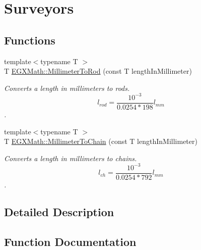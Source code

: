 \hypertarget{group___e_g_x_math-_conversions-_length_conversions-_millimeter-_surveyors}{}\section{Surveyors}
\label{group___e_g_x_math-_conversions-_length_conversions-_millimeter-_surveyors}
\subsection*{Functions}
\begin{DoxyCompactItemize}
\item 
{\footnotesize template$<$typename T $>$ }\\T \mbox{\hyperlink{group___e_g_x_math-_conversions-_length_conversions-_millimeter-_surveyors_ga658a03332f16e17bdd23bd770091b221}{E\+G\+X\+Math\+::\+Millimeter\+To\+Rod}} (const T length\+In\+Millimeter)
\begin{DoxyCompactList}\small\item\em Converts a length in millimeters to rods. \[ l_{rod}= \frac{10^{-3}}{0.0254 * 198} l_{mm} \]. \end{DoxyCompactList}\item 
{\footnotesize template$<$typename T $>$ }\\T \mbox{\hyperlink{group___e_g_x_math-_conversions-_length_conversions-_millimeter-_surveyors_gaacdbed15976b36734f17c99e024d96cd}{E\+G\+X\+Math\+::\+Millimeter\+To\+Chain}} (const T length\+In\+Millimeter)
\begin{DoxyCompactList}\small\item\em Converts a length in millimeters to chains. \[ l_{ch}= \frac{10^{-3}}{0.0254 * 792} l_{mm} \]. \end{DoxyCompactList}\end{DoxyCompactItemize}


\subsection{Detailed Description}


\subsection{Function Documentation}
\mbox{\label{group___e_g_x_math-_conversions-_length_conversions-_millimeter-_surveyors_gaacdbed15976b36734f17c99e024d96cd}} 

